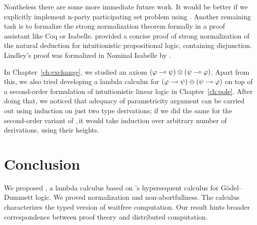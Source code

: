 Nontheless there are some more immediate future work.
It would be better if we explicitly implement n-party participating set
problem using \lgd.
Another remaining task is to formalize the strong normalization theorem
formally in a proof assistant like Coq or Isabelle.
\citet{ttlifting} provided a concise proof of strong normalization of
the natural deduction for
intuitionistic propositional logic, containing disjunction.
Lindley's proof was formalized in Nominal Isabelle by
\citet{Doczkal2009}.

In Chapter~\ref{ch:exchange}, we studied an axiom
$(\varphi\multimap\psi)\otimes(\psi\multimap\varphi)$.
Apart from this, we also tried developing a lambda calculus for
$(\varphi\multimap\psi)\oplus(\psi\multimap\varphi)$ on top of a second-order
formulation of intuitionistic linear logic in Chapter~\ref{ch:pole}.
After doing that, we noticed that adequacy of parametricity argument
can be carried out using induction on just two type derivations;
if we did the same for the second-order variant of \lgd,\,it would take
induction over arbitrary number of derivations, using their heights.

\section{Conclusion}
\label{conc}
We proposed \lgd, a lambda calculus
based on \citet{avron91}'s hypersequent calculus for
G\"odel--Dummett logic.
We proved normalization and non-abortfullness.
The calculus characterizes
the typed version of waitfree computation.
Our result hints broader correspondence between proof theory and distributed computation.

\renewcommand{\comodL}{\comod{c}{\co c}}
\renewcommand{\comodR}{\comod{\co c}{c}}

